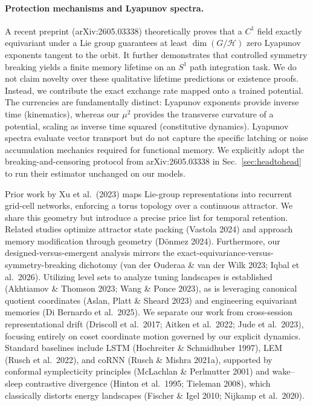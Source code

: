 \documentclass{article}
\begin{document}
\paragraph{Protection mechanisms and Lyapunov spectra.} A recent preprint (arXiv:2605.03338) theoretically proves that a $C^1$ field exactly equivariant under a Lie group guarantees at least $\dim(G/\mathcal H)$ zero Lyapunov exponents tangent to the orbit. It further demonstrates that controlled symmetry breaking yields a finite memory lifetime on an $S^1$ path integration task. We do not claim novelty over these qualitative lifetime predictions or existence proofs. Instead, we contribute the exact exchange rate mapped onto a trained potential. The currencies are fundamentally distinct: Lyapunov exponents provide inverse time (kinematics), whereas our $\mu^2$ provides the transverse curvature of a potential, scaling as inverse time squared (constitutive dynamics). Lyapunov spectra evaluate vector transport but do not capture the specific latching or noise accumulation mechanics required for functional memory. We explicitly adopt the breaking-and-censoring protocol from arXiv:2605.03338 in Sec.~\ref{sec:headtohead} to run their estimator unchanged on our models.

Prior work by Xu et al.\ (2023) maps Lie-group representations into recurrent grid-cell networks, enforcing a torus topology over a continuous attractor. We share this geometry but introduce a precise price list for temporal retention. Related studies optimize attractor state packing (Vastola 2024) and approach memory modification through geometry (D\"onmez 2024). Furthermore, our designed-versus-emergent analysis mirrors the exact-equivariance-versus-symmetry-breaking dichotomy (van der Ouderaa \& van der Wilk 2023; Iqbal et al.\ 2026). Utilizing level sets to analyze tuning landscapes is established (Akhtiamov \& Thomson 2023; Wang \& Ponce 2023), as is leveraging canonical quotient coordinates (Aslan, Platt \& Sheard 2023) and engineering equivariant memories (Di Bernardo et al.\ 2025). We separate our work from cross-session representational drift (Driscoll et al.\ 2017; Aitken et al.\ 2022; Jude et al.\ 2023), focusing entirely on coset coordinate motion governed by our explicit dynamics. Standard baselines include LSTM (Hochreiter \& Schmidhuber 1997), LEM (Rusch et al.\ 2022), and coRNN (Rusch \& Mishra 2021a), supported by conformal symplecticity principles (McLachlan \& Perlmutter 2001) and wake--sleep contrastive divergence (Hinton et al.\ 1995; Tieleman 2008), which classically distorts energy landscapes (Fischer \& Igel 2010; Nijkamp et al.\ 2020).
\end{document}
